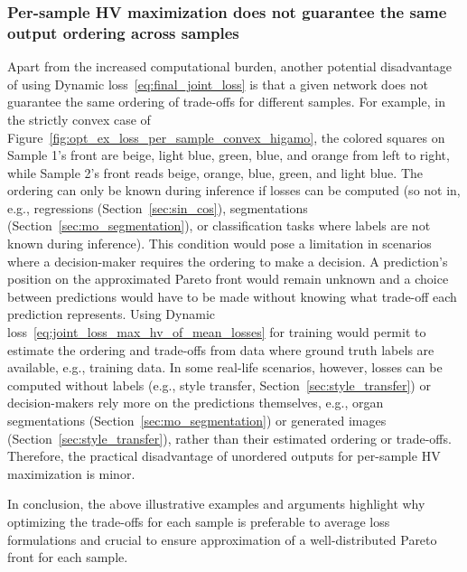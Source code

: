 \subsubsection{Per-sample HV maximization does not guarantee the same output ordering across samples}
Apart from the increased computational burden, another potential disadvantage of using Dynamic loss~\eqref{eq:final_joint_loss} is that a given network does not guarantee the same ordering of trade-offs for different samples. For example, in the strictly convex case of Figure~\ref{fig:opt_ex_loss_per_sample_convex_higamo}, the colored squares on Sample 1's front are beige, light blue, green, blue, and orange from left to right, while Sample 2's front reads beige, orange, blue, green, and light blue. The ordering can only be known during inference if losses can be computed (so not in, e.g., regressions (Section~\ref{sec:sin_cos}), segmentations (Section~\ref{sec:mo_segmentation}), or classification tasks where labels are not known during inference). This condition would pose a limitation in scenarios where a decision-maker requires the ordering to make a decision. A prediction's position on the approximated Pareto front would remain unknown and a choice between predictions would have to be made without knowing what trade-off each prediction represents. Using Dynamic loss~\eqref{eq:joint_loss_max_hv_of_mean_losses} for training would permit to estimate the ordering and trade-offs from data where ground truth labels are available, e.g., training data. In some real-life scenarios, however, losses can be computed without labels (e.g., style transfer, Section~\ref{sec:style_transfer}) or decision-makers rely more on the predictions themselves, e.g., organ segmentations (Section~\ref{sec:mo_segmentation}) or generated images (Section~\ref{sec:style_transfer}), rather than their estimated ordering or trade-offs. Therefore, the practical disadvantage of unordered outputs for per-sample HV maximization is minor.

In conclusion, the above illustrative examples and arguments highlight why optimizing the trade-offs for each sample is preferable to average loss formulations and crucial to ensure approximation of a well-distributed Pareto front for each sample.

